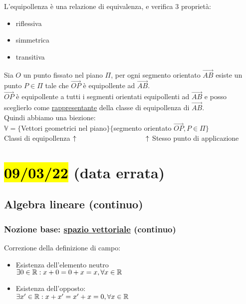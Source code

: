 \documentclass{article}
\begin{document}
\vspace*{2em}
L'equipollenza è una relazione di equivalenza, e verifica 3 proprietà:
\begin{itemize}
	\item riflessiva
	\item simmetrica
	\item transitiva
\end{itemize}
{Sia $O$ un punto fissato nel piano $\Pi$, per ogni segmento orientato $\vec{AB}$ esiste un punto $P\in\Pi$ tale che $\vec{OP}$ è equipollente ad $\vec{AB}$.\\
	$\vec{OP}$ è equipollente a tutti i segmenti orientati equipollenti ad $\vec{AB}$ e posso sceglierlo come \ul{rappresentante} della classe di equipollenza di $\vec{AB}$.\\
	Quindi abbiamo una biezione:\\
	$\mathbb{V}=\{$Vettori geometrici nel piano$\}\{$segmento orientato $\vec{OP},P\in\Pi\}$\\
	Classi di equipollenza $\uparrow\hspace*{10em}\uparrow$ Stesso punto di applicazione}
\section{\hl{09/03/22} (data errata)}
\subsection*{Algebra lineare (continuo)}
\subsubsection*{Nozione base: \ul{spazio vettoriale} (continuo)}
Correzione della definizione di campo:
\begin{itemize}
	\item Esistenza dell'elemento neutro\\$\exists0\in\mathbb{R}:x+0=0+x=x,\forall x\in\mathbb{R}$
	\item Esistenza dell'opposto:\\$\exists x'\in\mathbb{R}:x+x'=x'+x=0,\forall x\in\mathbb{R}$
\end{itemize}
\hrulefill
\end{document}
